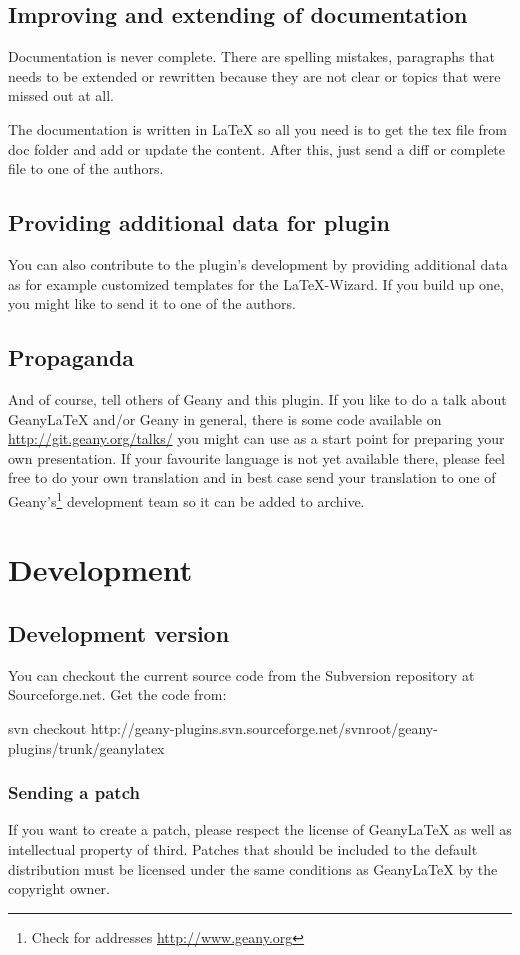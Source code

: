 \documentclass[%
a4paper,%
10pt,%
oneside,%
DIV18,
headsepline,
plainheadsepline,
footsepline,
plainfootsepline,
bibtotoc,%
liststotoc,%
BCOR12mm,%
halfparskip,%
openany,%
]{scrartcl}
\begin{document}
\subsection{Improving and extending of documentation}
Documentation is never complete. There are spelling mistakes,
paragraphs that needs to be extended or rewritten because they are not
clear or topics that were missed out at all.

The documentation is written in \LaTeX{} so all you need is to get the
tex file from doc folder and add or update the content.
After this, just send a diff or complete file to one of the authors.

\subsection{Providing additional data for plugin}

You can also contribute to the plugin's development by providing
additional data as for example customized templates for the
\LaTeX-Wizard. If you build up one, you might like to send it to
one of the authors.

\subsection{Propaganda}
And of course, tell others of Geany and this plugin. If you like to do
a talk about Geany\LaTeX{} and/or Geany in general, there is some code
available on \url{http://git.geany.org/talks/} you might can use as a
start point for preparing your own presentation. If your favourite
language is not yet available there, please feel free to do your own
translation and in best case send your translation to one of
Geany's\footnote{Check for addresses \url{http://www.geany.org}}
development team so it can be added to archive.


\section{Development}
\subsection{Development version}
You can checkout the current source code from the Subversion repository
at Sourceforge.net. Get the code from:

svn checkout
http://geany-plugins.svn.sourceforge.net/svnroot/geany-plugins/trunk/geanylatex

\subsubsection{Sending a patch}
If you want to create a patch, please respect the license of
Geany\LaTeX{} as well as intellectual property of third. Patches that
should be included to the default distribution must be licensed under
the same conditions as Geany\LaTeX{} by the copyright owner.
\end{document}
